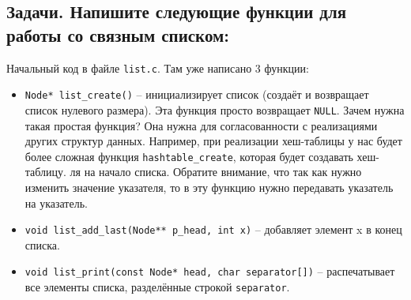 \documentclass{article}
\begin{document}
\newpage
\subsection*{Задачи. Напишите следующие функции для работы со связным списком:}
Начальный код в файле \texttt{list.c}. Там уже написано 3 функции:
\begin{itemize}
\item \texttt{Node* list\_create()} -- инициализирует список (создаёт и возвращает список нулевого размера). Эта функция просто возвращает \texttt{NULL}. Зачем нужна такая простая функция? Она нужна для согласованности с реализациями других структур данных. Например, при реализации хеш-таблицы у нас будет более сложная функция \texttt{hashtable\_create}, которая будет создавать хеш-таблицу.
ля на начало списка. Обратите внимание, что так как нужно изменить значение указателя, то в эту функцию нужно передавать указатель на указатель.
\item \texttt{void list\_add\_last(Node** p\_head, int x)} -- добавляет элемент x в конец списка.
\item \texttt{void list\_print(const Node* head, char separator[])} -- распечатывает все элементы списка, разделённые строкой \texttt{separator}. 
\end{itemize}
\end{document}
